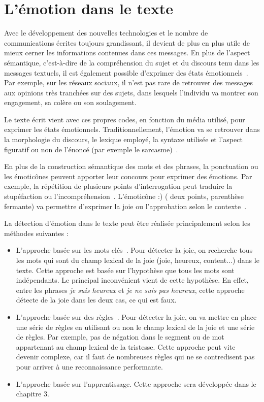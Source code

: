 \section{L'émotion dans le texte}
Avec le développement des nouvelles technologies et le nombre de communications écrites toujours grandissant, il devient de plus en plus utile de mieux cerner les informations contenues dans ces messages. En plus de l'aspect sémantique, c'est-à-dire de la compréhension du sujet et du discours tenu dans les messages textuels, il est également possible d'exprimer des états émotionnels~\cite{Hancock2007,SchwarzFriesel2015}. Par exemple, sur les réseaux sociaux, il n'est pas rare de retrouver des messages aux opinions très tranchées sur des sujets, dans lesquels l'individu va montrer son engagement, sa colère ou son soulagement.

Le texte écrit vient avec ces propres codes, en fonction du média utilisé, pour exprimer les états émotionnels. Traditionnellement, l'émotion va se retrouver dans la morphologie du discours, le lexique employé, la syntaxe utilisée et l'aspect figuratif ou non de l'énoncé (par exemple le sarcasme)~\cite{Sailunaz2018}.

En plus de la construction sémantique des mots et des phrases, la ponctuation ou les émoticônes peuvent apporter leur concours pour exprimer des émotions. Par exemple, la répétition de plusieurs points d'interrogation peut traduire la stupéfaction ou l'incompréhension~\cite{Thurlow2013}. L’émoticône :) ( deux points, parenthèse fermante) va permettre d'exprimer la joie ou l'approbation selon le contexte~\cite{Provine2007}.

La détection d'émotion dans le texte peut être réalisée principalement selon les méthodes suivantes :
\begin{itemize}
  \item L'approche basée sur les mots clés~\cite{Ma2005,Liu2003}. Pour détecter la joie, on recherche tous les mots qui sont du champ lexical de la joie (joie, heureux, content...) dans le texte. Cette approche est basée sur l'hypothèse que tous les mots sont indépendants. Le principal inconvénient vient de cette hypothèse. En effet, entre les phrases \textit{je suis heureux} et \textit{je ne suis pas heureux}, cette approche détecte de la joie dans les deux cas, ce qui est faux.
  \item L'approche basée sur des règles~\cite{AlMasum2007,Chaumartin2007}. Pour détecter la joie, on va mettre en place une série de règles en utilisant ou non le champ lexical de la joie et une série de règles. Par exemple, pas de négation dans le segment ou de mot appartenant au champ lexical de la tristesse. Cette approche peut vite devenir complexe, car il faut de nombreuses règles qui ne se contredisent pas pour arriver à une reconnaissance performante.
  \item L'approche basée sur l'apprentissage. Cette approche sera développée dans le chapitre 3.
\end{itemize}

